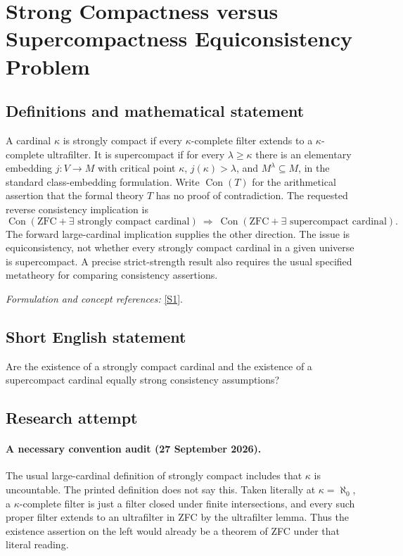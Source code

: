 \documentclass[11pt]{article}
\begin{document}
\section*{\texorpdfstring{Strong Compactness versus Supercompactness Equiconsistency Problem}{Strong Compactness versus Supercompactness Equiconsistency Problem}}\label{361}
\subsection{Definitions and mathematical statement}
A cardinal $\kappa$ is strongly compact if every $\kappa$-complete filter extends to a $\kappa$-complete ultrafilter. It is supercompact if for every $\lambda\ge\kappa$ there is an elementary embedding $j:V\to M$ with critical point $\kappa$, $j(\kappa)>\lambda$, and $M^\lambda\subseteq M$, in the standard class-embedding formulation. Write $\operatorname{Con}(T)$ for the arithmetical assertion that the formal theory $T$ has no proof of contradiction. The requested reverse consistency implication is
\[
 \operatorname{Con}(\mathrm{ZFC}+\exists\text{ strongly compact cardinal})
 \ \Longrightarrow\
 \operatorname{Con}(\mathrm{ZFC}+\exists\text{ supercompact cardinal}).
\]
The forward large-cardinal implication supplies the other direction. The issue is equiconsistency, not whether every strongly compact cardinal in a given universe is supercompact. A precise strict-strength result also requires the usual specified metatheory for comparing consistency assertions.
\par\smallskip\textit{Formulation and concept references:} \href{https://arxiv.org/abs/1810.05058}{[S1]}.

\subsection{Short English statement}
Are the existence of a strongly compact cardinal and the existence of a supercompact cardinal equally strong consistency assumptions?
\subsection{Research attempt}
\paragraph{A necessary convention audit (27 September 2026).}
The usual large-cardinal definition of strongly compact includes that
$\kappa$ is uncountable. The printed definition does not say this.
Taken literally at $\kappa=\aleph_0$, a $\kappa$-complete filter is
just a filter closed under finite intersections, and every such proper
filter extends to an ultrafilter in ZFC by the ultrafilter lemma.
Thus the existence assertion on the left would already be a theorem
of ZFC under that literal reading.
\end{document}
